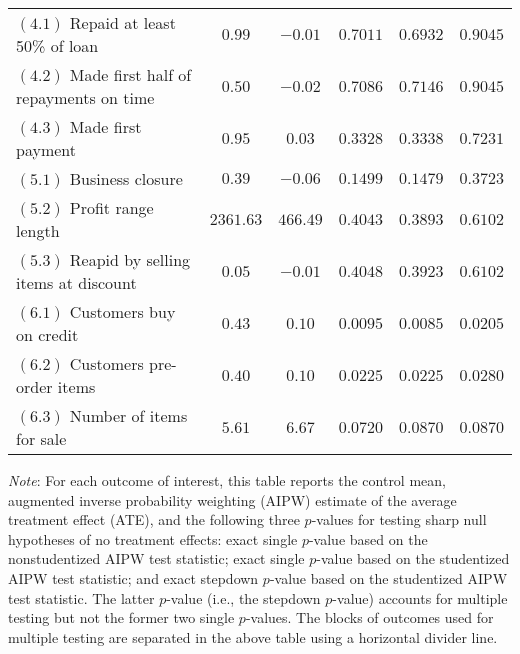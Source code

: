 \begin{table}[!ht]
\begin{center}
\begin{tabular}{l|cc|ccc}
\hline
 $ (4.1) $ Repaid at least 50\% of loan & $  0.99 $ & $ -0.01 $ & $  0.7011  $ & $  0.6932  $ & $  0.9045  $ \\ 
 $ (4.2) $ Made first half of repayments on time & $  0.50 $ & $ -0.02 $ & $  0.7086  $ & $  0.7146  $ & $  0.9045  $ \\ 
 $ (4.3) $ Made first payment & $  0.95 $ & $  0.03 $ & $  0.3328  $ & $  0.3338  $ & $  0.7231  $ \\ 
\hline
 $ (5.1) $ Business closure & $  0.39 $ & $ -0.06 $ & $  0.1499  $ & $  0.1479  $ & $  0.3723  $ \\ 
 $ (5.2) $ Profit range length & $ 2361.63 $ & $ 466.49 $ & $  0.4043  $ & $  0.3893  $ & $  0.6102  $ \\ 
 $ (5.3) $ Reapid by selling items at discount & $  0.05 $ & $ -0.01 $ & $  0.4048  $ & $  0.3923  $ & $  0.6102  $ \\ 
\hline
 $ (6.1) $ Customers buy on credit & $  0.43 $ & $  0.10 $ & $ \mathbf { 0.0095 } $ & $ \mathbf { 0.0085 } $ & $ \mathbf { 0.0205 } $ \\ 
 $ (6.2) $ Customers pre-order items & $  0.40 $ & $  0.10 $ & $ \mathbf { 0.0225 } $ & $ \mathbf { 0.0225 } $ & $ \mathbf { 0.0280 } $ \\ 
 $ (6.3) $ Number of items for sale & $  5.61 $ & $  6.67 $ & $ \mathbf { 0.0720 } $ & $ \mathbf { 0.0870 } $ & $ \mathbf { 0.0870 } $ \\ 
\hline
\hline
\end{tabular}
\end{center} \vspace{-2mm}
\noindent \scriptsize
\textit{Note}: For each outcome of interest, this table reports the control mean, augmented inverse probability weighting (AIPW) estimate of the average treatment effect (ATE), and the following three $ p$-values for testing sharp null hypotheses of no treatment effects: exact single $ p$-value based on the nonstudentized AIPW test statistic; exact single $ p$-value based on the studentized AIPW test statistic; and exact stepdown $ p$-value based on the studentized AIPW test statistic. The latter $ p$-value (i.e., the stepdown $ p$-value) accounts for multiple testing but not the former two single $ p$-values. The blocks of outcomes used for multiple testing are separated in the above table using a horizontal divider line.
\end{table}
